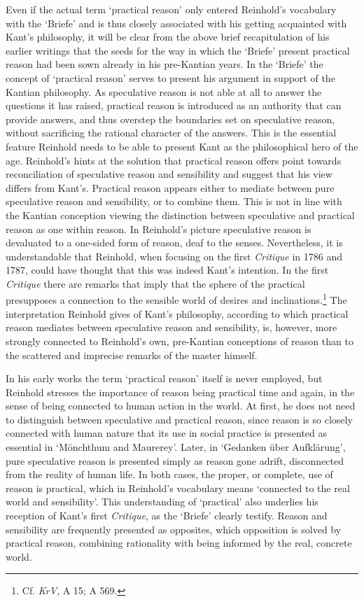 Even if the actual term `practical reason' only entered Reinhold's vocabulary with the `Briefe' and is thus closely associated with his getting acquainted with Kant's philosophy, it will be clear from the above brief recapitulation of his earlier writings that the seeds for the way in which the `Briefe' present practical reason had been sown already in his pre{-}Kantian years. In the `Briefe' the concept of `practical reason' serves to present his argument in support of the Kantian philosophy. As speculative reason is not able at all to answer the questions it has raised, practical reason is introduced as an authority that can provide answers, and thus overstep the boundaries set on speculative reason, without sacrificing the rational character of the answers. This is the essential feature Reinhold needs to be able to present Kant as the philosophical hero of the age. Reinhold's hints at the solution that practical reason offers point towards reconciliation of speculative reason and sensibility and suggest that his view differs from Kant's. Practical reason appears either to mediate between pure speculative reason and sensibility, or to combine them. This is not in line with the Kantian conception viewing the distinction between speculative and practical reason as one within reason. In Reinhold's picture speculative reason is devaluated to a one{-}sided form of reason, deaf to the senses. Nevertheless, it is understandable that Reinhold, when focusing on the first \textit{Critique} in 1786 and 1787, could have thought that this was indeed Kant's intention. In the first \textit{Critique} there are remarks that imply that the sphere of the practical presupposes a connection to the sensible world of desires and inclinations.\footnote{ Cf. \textit{KrV}, A 15; A 569. } The interpretation Reinhold gives of Kant's philosophy, according to which practical reason mediates between speculative reason and sensibility, is, however, more strongly connected to Reinhold's own, pre{-}Kantian conceptions of reason than to the scattered and imprecise remarks of the master himself. 

In his early works the term `practical reason' itself is never employed, but Reinhold stresses the importance of reason being practical time and again, in the sense of being connected to human action in the world. At first, he does not need to distinguish between speculative and practical reason, since reason is so closely connected with human nature that its use in social practice is presented as essential in `M\"{o}nchthum and Maurerey'. Later, in `Gedanken \"{u}ber Aufkl\"{a}rung', pure speculative reason is presented simply as reason gone adrift, disconnected from the reality of human life. In both cases, the proper, or complete, use of reason is practical, which in Reinhold's vocabulary means `connected to the real world and sensibility'. This understanding of `practical' also underlies his reception of Kant's first \textit{Critique}, as the `Briefe' clearly testify. Reason and sensibility are frequently presented as opposites, which opposition is solved by practical reason, combining rationality with being informed by the real, concrete world. 


